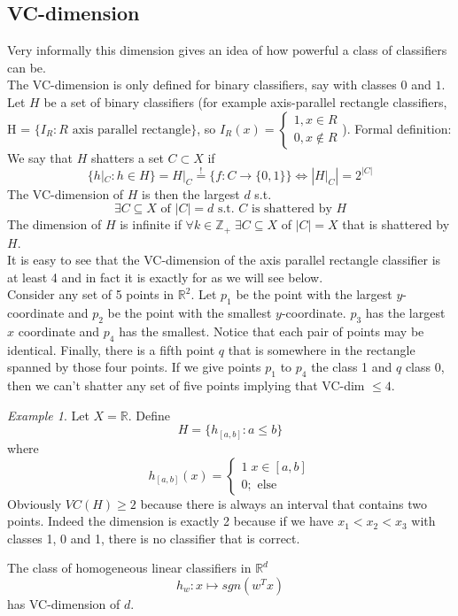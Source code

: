\documentclass[a4paper, 12pt]{article}
\theoremstyle{plain}
\theoremstyle{definition}
\theoremstyle{lemma}
\theoremstyle{remark}
\theoremstyle{example}
\newtheorem{example}[theorem]{Example}
\begin{document}
	\subsection{VC-dimension}
	Very informally this dimension gives an idea of how powerful a class of classifiers can be.\\
	The VC-dimension is only defined for binary classifiers, say with classes $0$ and $1$. Let $H$ be a set of binary classifiers (for example axis-parallel rectangle classifiers, H = $\{I_R: R \text{ axis parallel rectangle}\}$, so $I_R(x) = \begin{cases}
		1, x \in R\\
		0, x \notin R
	\end{cases}$).
	Formal definition: We say that $H$ shatters a set $C \subset X$ if \[\{h|_C: h \in H\} = H|_C \overset{!}{=} \{f: C \to \{0,1\}\} \Leftrightarrow \left|H|_C\right| = 2^{\left|C\right|}\]  
	The VC-dimension of $H$ is then the largest $d$ s.t. \[\exists C \subseteq X \text{ of } \left|C\right| = d \text{ s.t. } C \text{ is shattered by } H\]
	The dimension of $H$ is infinite if $\forall k \in \mathbb{Z}_+ \; \exists C \subseteq X$ of $\left|C\right| = X$ that is shattered by $H$.\\
	It is easy to see that the VC-dimension of the axis parallel rectangle classifier is at least 4 and in fact it is exactly for as we will see below.\\
	Consider any set of 5 points in $\mathbb{R}^2$. Let $p_1$ be the point with the largest $y$-coordinate and $p_2$ be the point with the smallest $y$-coordinate. $p_3$ has the largest $x$ coordinate and $p_4$ has the smallest. Notice that each pair of points may be identical. Finally, there is a fifth point $q$ that is somewhere in the rectangle spanned by those four points. If we give points $p_1$ to $p_4$ the class 1 and $q$ class 0, then we can't shatter any set of five points implying that VC-dim $\leq 4$.
	\begin{example}
		Let $X = \mathbb{R}$. Define \[H = \{h_{[a,b]}: a\leq b\}\] where \[h_{[a,b]}(x) = \begin{cases}
			1 \; x \in [a,b]\\
			0; \text{ else}
		\end{cases}\]
		Obviously $VC(H) \geq 2$ because there is always an interval that contains two points. Indeed the dimension is exactly 2 because if we have $x_1 < x_2 < x_3$ with classes 1, 0 and 1, there is no classifier that is correct.
	\end{example}
	The class of homogeneous linear classifiers in $\mathbb{R}^d$ \[h_w: x \mapsto sgn(w^Tx)\] has VC-dimension of $d$.
\end{document}
